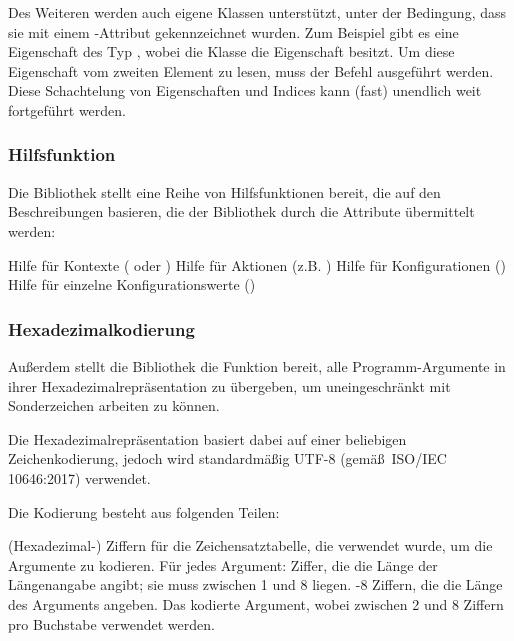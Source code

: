 Des Weiteren werden auch eigene Klassen unterstützt, unter der Bedingung, dass sie mit einem -Attribut gekennzeichnet wurden.
Zum Beispiel gibt es eine Eigenschaft des Typ , wobei die Klasse  die Eigenschaft  besitzt.
Um diese Eigenschaft vom zweiten Element zu lesen, muss der Befehl  ausgeführt werden.
Diese Schachtelung von Eigenschaften und Indices kann (fast) unendlich weit fortgeführt werden.


\subsubsection{Hilfsfunktion}
Die Bibliothek stellt eine Reihe von Hilfsfunktionen bereit, die auf den Beschreibungen basieren, die der Bibliothek durch die Attribute übermittelt werden:
\begin{outline}
 \1 Hilfe für Kontexte ( oder )
 \1 Hilfe für Aktionen (z.B. )
 \1 Hilfe für Konfigurationen ()
 \1 Hilfe für einzelne Konfigurationswerte ()
\end{outline}
\subsubsection{Hexadezimalkodierung}\label{Hexadecimalencoding}
Außerdem stellt die Bibliothek die Funktion bereit, alle Programm-Argumente in ihrer Hexadezimalrepräsentation zu übergeben, um uneingeschränkt mit Sonderzeichen arbeiten zu können.

Die Hexadezimalrepräsentation basiert dabei auf einer beliebigen Zeichenkodierung, jedoch wird standardmäßig UTF-8 (gemäß~ISO/IEC 10646:2017) verwendet.

Die Kodierung besteht aus folgenden Teilen:
\begin{outline}
  (Hexadezimal-) Ziffern für die Zeichensatztabelle, die verwendet wurde, um die Argumente zu kodieren.
 \1 Für jedes Argument:
   Ziffer, die die Länge der Längenangabe angibt;
  sie muss zwischen 1 und 8 liegen. 
  -8 Ziffern, die die Länge des Arguments angeben.
  \2 Das kodierte Argument, wobei zwischen 2 und 8 Ziffern pro Buchstabe verwendet werden.
\end{outline}


